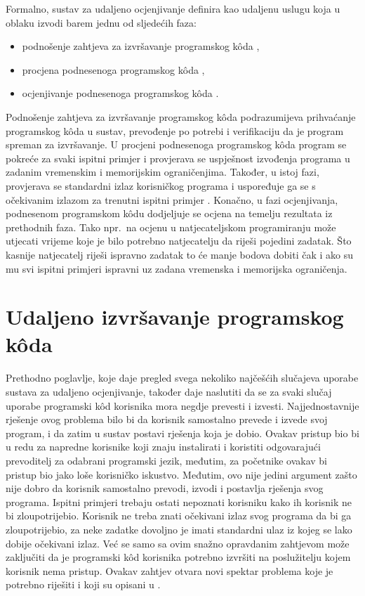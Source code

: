 \documentclass[times, utf8, diplomski]{fer}
\begin{document}
Formalno, sustav za udaljeno ocjenjivanje \citep{wasik2018survey} definira kao udaljenu uslugu  koja u oblaku  izvodi barem jednu od sljedećih faza:
\begin{itemize}
    \item podnošenje zahtjeva za izvršavanje programskog kôda ,
    \item procjena podnesenoga programskog kôda ,
    \item ocjenjivanje podnesenoga programskog kôda .
\end{itemize}

Podnošenje zahtjeva za izvršavanje programskog kôda podrazumijeva prihvaćanje programskog kôda u sustav, prevođenje po potrebi i verifikaciju da je program spreman za izvršavanje. U procjeni podnesenoga programskog kôda program se pokreće za svaki ispitni primjer i provjerava se uspješnost izvođenja programa u zadanim vremenskim i memorijskim ograničenjima. Također, u istoj fazi, provjerava se standardni izlaz  korisničkog programa i uspoređuje ga se s očekivanim izlazom za trenutni ispitni primjer . Konačno, u fazi ocjenjivanja, podnesenom programskom kôdu dodjeljuje se ocjena na temelju rezultata iz prethodnih faza. Tako npr.\ na ocjenu u natjecateljskom programiranju može utjecati vrijeme koje je bilo potrebno natjecatelju da riješi pojedini zadatak. Što kasnije natjecatelj riješi ispravno zadatak to će manje bodova dobiti čak i ako su mu svi ispitni primjeri ispravni uz zadana vremenska i memorijska ograničenja.

\section{Udaljeno izvršavanje programskog kôda}
Prethodno poglavlje, koje daje pregled svega nekoliko najčešćih slučajeva uporabe sustava za udaljeno ocjenjivanje, također daje naslutiti da se za svaki slučaj uporabe programski kôd korisnika mora negdje prevesti i izvesti. Najjednostavnije rješenje ovog problema bilo bi da korisnik samostalno prevede i izvede svoj program, i da zatim u sustav postavi rješenja koja je dobio. Ovakav pristup bio bi u redu za napredne korisnike koji znaju instalirati i koristiti odgovarajući prevoditelj za odabrani programski jezik, međutim, za početnike ovakav bi pristup bio jako loše korisničko iskustvo. Međutim, ovo nije jedini argument zašto nije dobro da korisnik samostalno prevodi, izvodi i postavlja rješenja svog programa. Ispitni primjeri trebaju ostati nepoznati korisniku kako ih korisnik ne bi zloupotrijebio. Korisnik ne treba znati očekivani izlaz svog programa da bi ga zloupotrijebio, za neke zadatke dovoljno je imati standardni ulaz  iz kojeg se lako dobije očekivani izlaz. Već se samo sa ovim snažno opravdanim zahtjevom može zaključiti da je programski kôd korisnika potrebno izvršiti na poslužitelju kojem korisnik nema pristup. Ovakav zahtjev otvara novi spektar problema koje je potrebno riješiti i koji su opisani u \citep{kurnia2001online}.
\end{document}
